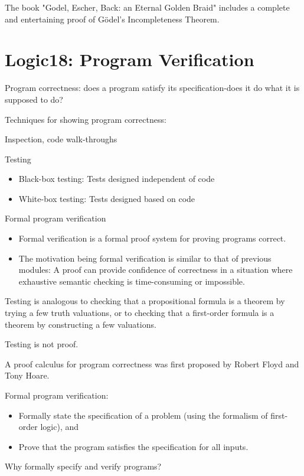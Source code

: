 \documentclass{article}
\begin{document}
The book "Godel, Escher, Back: an Eternal Golden Braid" includes a complete and entertaining proof of Gödel's Incompleteness Theorem.

\section{Logic18: Program Verification}

Program correctness: does a program satisfy its specification-does it do what it is supposed to do?

Techniques for showing program correctness:

Inspection, code walk-throughs

Testing
\begin{itemize}
    \item Black-box testing: Tests designed independent of code
    \item White-box testing: Tests designed based on code
\end{itemize}

Formal program verification
\begin{itemize}
    \item Formal verification is a formal proof system for proving programs correct.
    \item The motivation being formal verification is similar to that of previous modules: A proof can provide confidence of correctness in a situation where exhaustive semantic checking is time-consuming or impossible.
\end{itemize}

Testing is analogous to checking that a propositional formula is a theorem by trying a few truth valuations, or to checking that a first-order formula is a theorem by constructing a few valuations.

Testing is not proof.


A proof calculus for program correctness was first proposed by Robert Floyd and Tony Hoare. 

Formal program verification:
\begin{itemize}
    \item Formally state the specification of a problem (using the formalism of first-order logic), and
    \item Prove that the program satisfies the specification for all inputs.
\end{itemize}

Why formally specify and verify programs?
\end{document}

